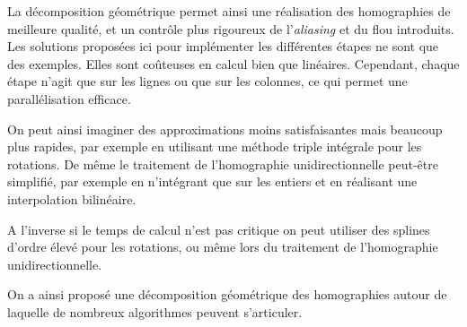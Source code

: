
La décomposition géométrique permet ainsi une réalisation des homographies de meilleure qualité, et un contrôle plus rigoureux de l'\emph{aliasing} et du flou introduits. Les solutions proposées ici pour implémenter les différentes étapes ne sont que des exemples. Elles sont coûteuses en calcul bien que linéaires. Cependant, chaque étape n'agit que sur les lignes ou que sur les colonnes, ce qui permet une parallélisation efficace.

On peut ainsi imaginer des approximations moins satisfaisantes mais beaucoup plus rapides, par exemple en utilisant une méthode triple intégrale pour les rotations. De même le traitement de l'homographie unidirectionnelle peut-être simplifié, par exemple en n'intégrant que sur les entiers et en réalisant une interpolation bilinéaire.

A l'inverse si le temps de calcul n'est pas critique on peut utiliser des splines d'ordre élevé pour les rotations, ou même lors du traitement de l'homographie unidirectionnelle.

On a ainsi proposé une décomposition géométrique des homographies autour de laquelle de nombreux algorithmes peuvent s'articuler.

